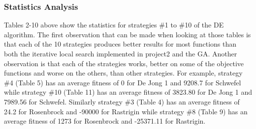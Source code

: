 \documentclass[12pt]{article}
\begin{document}
				\subsubsection{Statistics Analysis}
				
					Tables 2-10 above show the statistics for strategies \#1 to \#10 of the DE  algorithm. The first observation that can be made when looking at those tables is that each of the 10 strategies produces better results for most functions than both the iterative local search implemented in project2 and the GA. Another observation is that each of the strategies works, better on some of the objective functions and worse on the others, than other strategies. For example, strategy \#4 (Table 5) has an average fitness of 0 for De Jong 1 and 9208.7 for  Schwefel while strategy \#10 (Table 11) has an average fitness of 3823.80 for De Jong 1 and 7989.56 for Schwefel. Similarly strategy \#3 (Table 4) has an average fitness of 24.2 for Rosenbrock and -90000 for  Rastrigin while strategy \#8 (Table 9) has an average fitness of 1273 for Rosenbrock  and -25371.11 for Rastrigin.
					
\end{document}
